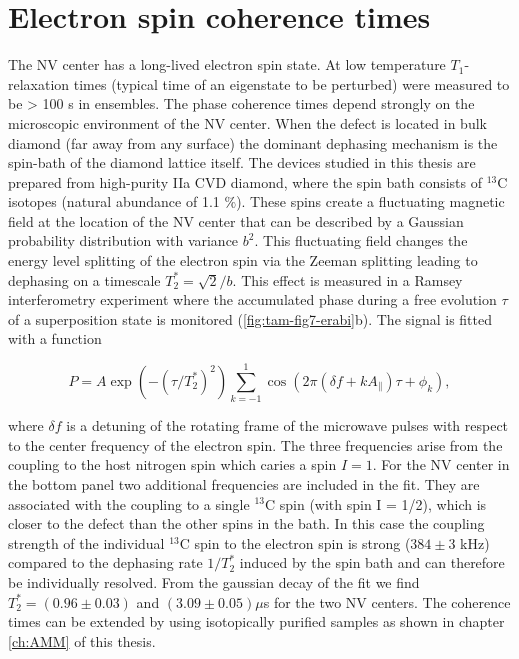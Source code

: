 \section{Electron spin coherence times}
\label{sec:elcohtimes}
The NV center has a long-lived electron spin state. At low temperature $T_1$-relaxation times (typical time of an eigenstate to be perturbed) were measured to be > 100 s in ensembles\cite{Jarmola_Phys.Rev.Lett._2012}. The phase coherence times depend strongly on the microscopic environment of the NV center. When the defect is located in bulk diamond (far away from any surface) the dominant dephasing mechanism is the spin-bath of the diamond lattice itself. The devices studied in this thesis are prepared from high-purity IIa CVD diamond, where the spin bath consists of $^{13}$C isotopes (natural abundance of 1.1 $\%$). These spins create a fluctuating magnetic field at the location of the NV center that can be described by a Gaussian probability distribution with variance $b^2$. This fluctuating field changes the energy level splitting of the electron spin via the Zeeman splitting leading to dephasing on a timescale $T_2^{*} = \sqrt{2}/b$. This effect is measured in a Ramsey interferometry experiment where the accumulated phase during a free evolution $\tau$ of a superposition state is monitored (\ref{fig:tam-fig7-erabi}b). The signal is fitted with a function

\begin{equation}\label{eq:tam-ramsey}
P = A \exp(-(\tau/T_2^*)^2)\sum\limits_{k=-1}^1 \cos(2 \pi(\delta f +k A_{\parallel})\tau +\phi_k),
\end{equation}

where $\delta f$ is a detuning of the rotating frame of the microwave pulses with respect to the center frequency of the electron spin. The three frequencies arise from the coupling to the host nitrogen spin which caries a spin $I = 1$. For the NV center in the bottom panel two additional frequencies are included in the fit. They are associated with the coupling to a single $^{13}$C spin (with spin I = 1/2), which is closer to the defect than the other spins in the bath. In this case the coupling strength of the individual $^{13}$C spin to the electron spin is strong ($384 \pm 3$ kHz) compared to the dephasing rate $1/T_2^*$ induced by the spin bath and can therefore be individually resolved. From the gaussian decay of the fit we find $T_2^{*} = (0.96 \pm 0.03)$ and $(3.09 \pm 0.05) \mu$s for the two NV centers. The coherence times can be extended by using isotopically purified samples as shown in chapter \ref{ch:AMM} of this thesis. 

